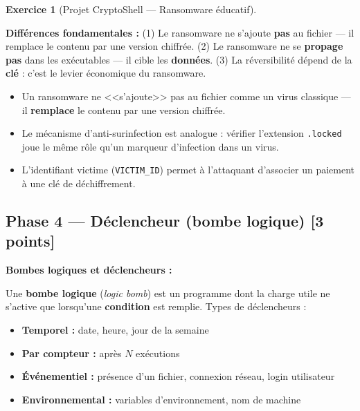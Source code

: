 \documentclass[a4paper,11pt]{article}
\theoremstyle{plain}
\theoremstyle{definition}
\newtheorem{exercice}{Exercice}
\begin{document}
\begin{exercice}[Projet CryptoShell --- Ransomware éducatif]
\begin{correction}
\textbf{Différences fondamentales :} (1) Le ransomware ne s'ajoute \textbf{pas} au fichier --- il remplace le contenu par une version chiffrée. (2) Le ransomware ne se \textbf{propage pas} dans les exécutables --- il cible les \textbf{données}. (3) La réversibilité dépend de la \textbf{clé} : c'est le levier économique du ransomware.

\begin{pointcle}
\begin{itemize}
    \item Un ransomware ne <<s'ajoute>> pas au fichier comme un virus classique --- il \textbf{remplace} le contenu par une version chiffrée.
    \item Le mécanisme d'anti-surinfection est analogue : vérifier l'extension \texttt{.locked} joue le même rôle qu'un marqueur d'infection dans un virus.
    \item L'identifiant victime (\texttt{VICTIM\_ID}) permet à l'attaquant d'associer un paiement à une clé de déchiffrement.
\end{itemize}
\end{pointcle}

\end{correction}



\subsection*{Phase 4 --- Déclencheur (bombe logique) \hfill \normalsize [3 points]}

\begin{rappel}
\textbf{Bombes logiques et déclencheurs :}

Une \textbf{bombe logique} (\textit{logic bomb}) est un programme dont la charge utile ne s'active que lorsqu'une \textbf{condition} est remplie. Types de déclencheurs :
\begin{itemize}
    \item \textbf{Temporel :} date, heure, jour de la semaine
    \item \textbf{Par compteur :} après $N$ exécutions
    \item \textbf{Événementiel :} présence d'un fichier, connexion réseau, login utilisateur
    \item \textbf{Environnemental :} variables d'environnement, nom de machine
\end{itemize}


\end{rappel}
\end{exercice}
\end{document}
